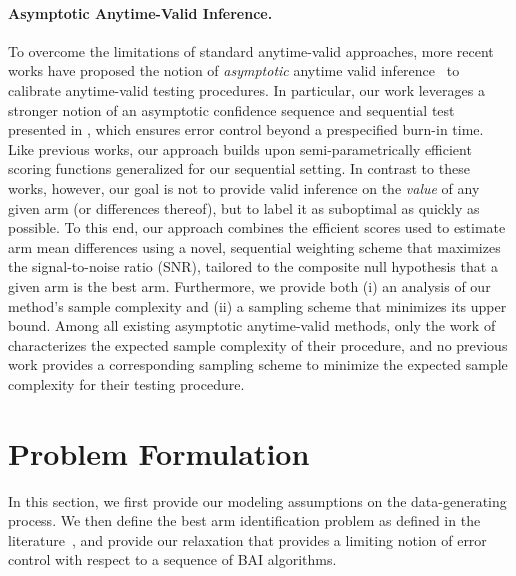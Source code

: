 \documentclass{article}
\begin{document}
\paragraph{Asymptotic Anytime-Valid Inference.} To overcome the limitations of standard anytime-valid approaches, more recent works have proposed the notion of \textit{asymptotic} anytime valid inference~\citep{waudbysmith2024timeuniformcentrallimittheory, bibaut2024nearoptimalnonparametricsequentialtests} to calibrate anytime-valid testing procedures. In particular, our work leverages a stronger notion of an asymptotic confidence sequence and sequential test presented in \citet{bibaut2024nearoptimalnonparametricsequentialtests}, which ensures error control beyond a prespecified burn-in time. Like previous works, our approach builds upon semi-parametrically efficient scoring functions \citep{bickel1998efficient, chernozhukov2024doubledebiasedmachinelearningtreatment, cook2024semiparametricefficientinferenceadaptive, oprescu2025efficientadaptiveexperimentationnoncompliance} generalized for our sequential setting. In contrast to these works, however, our goal is not to provide valid inference on the \textit{value} of any given arm (or differences thereof), but to label it as suboptimal as quickly as possible. To this end, our approach combines the efficient scores used to estimate arm mean differences using a novel, sequential weighting scheme that maximizes the signal-to-noise ratio (SNR), tailored to the composite null hypothesis that a given arm is the best arm. Furthermore, we provide both (i) an analysis of our method's sample complexity and (ii) a sampling scheme that minimizes its upper bound. Among all existing asymptotic anytime-valid methods, only the work of \cite{bibaut2024nearoptimalnonparametricsequentialtests} characterizes the expected sample complexity of their procedure, and no previous work provides a corresponding sampling scheme to minimize the expected sample complexity for their testing procedure. 


\section{Problem Formulation}\label{sec:problem_statement}

In this section, we first provide our modeling assumptions on the data-generating process. We then define the best arm identification problem as defined in the literature~\citep{garivier2016optimalbestarmidentification}, and provide our relaxation that provides a limiting notion of error control with respect to a sequence of BAI algorithms.
\end{document}
